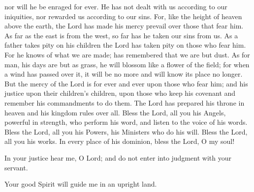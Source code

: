 \documentclass{article}
\begin{document}
\begin{service}
\begin{multicols}{2}
{			nor will he be enraged for ever. He has not dealt with us according to our
			iniquities, nor rewarded us according to our sins. For, like the height of
			heaven above the earth, the Lord has made his mercy prevail over those that
			fear him. As far as the east is from the west, so far has he taken our sins from
			us. As a father takes pity on his children the Lord has taken pity on those who
			fear him. For he knows of what we are made; has remembered that we are but dust.
			As for man, his days are but as grass, he will blossom like a flower of the
			field; for when a wind has passed over it, it will be no more and will know its
			place no longer. But the mercy of the Lord is for ever and ever upon those
			who fear him; and his justice upon their children's children, upon those who
			keep his covenant and remember his commandments to do them. The Lord
			has prepared his throne in heaven and his kingdom rules over all. Bless the
			Lord, all you his Angels, powerful in strength, who perform his word, and
			listen to the voice of his words. Bless the Lord, all you his Powers, his
			Ministers who do his will. Bless the Lord, all you his works. In every place
			of his dominion, bless the Lord, O my soul!
			\andagain
			\item In your justice hear me, O Lord; and do not enter into judgment with
			your servant. 
			\item Your good Spirit will guide me in an upright land.
		}
		\rest
		\entry{
			\glorybothnow
			\item \alleluia
		}
	\end{multicols}
	\pagebreak

\end{service}
\end{document}
